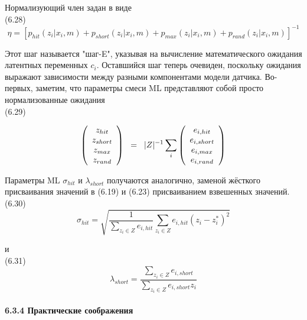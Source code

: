 \documentclass[10pt,a4paper]{article}
\begin{document}
Нормализующий член задан в виде\\

(6.28)
$$\eta=[p_{hit}(z_i|x_i,m)+p_{short}(z_i|x_i,m)
+p_{max}(z_i|x_i,m)+p_{rand}(z_i|x_i,m)]^{-1}$$

Этот шаг называется "шаг-E", указывая на вычисление математического ожидания латентных переменных $c_i$. Оставшийся шаг теперь очевиден, поскольку ожидания выражают зависимости между разными компонентами модели датчика. Во-первых, заметим, что параметры смеси ML представляют собой просто нормализованные ожидания\\

(6.29)
\begin{minipage}{0.3\textwidth}
	\begin{equation*}
	\left(\begin{array}{c}
	z_{hit}\\
	z_{short}\\
	z_{max}\\
	z_{rand}\\
	\end{array}\right)
	\hspace{2mm}
	=
	\hspace{2mm}
	|Z|^{-1}\sum_i
	\left(\begin{array}{c}
	e_{i,hit}\\
	e_{i,short}\\
	e_{i,max}\\
	e_{i,rand}\\
	\end{array}\right)
	\end{equation*}
\end{minipage}

Параметры ML $\sigma_{hit}$ и $\lambda_{short}$ получаются аналогично, заменой жёсткого присваивания значений в (6.19) и (6.23) присваиванием взвешенных значений.\\

(6.30)
$$\sigma_{hit}=\sqrt{\frac{1}{\sum_{z_i\in Z}e_{i,hit}}\sum_{z_i\in Z}e_{i,hit}(z_i-z_i^*)^2}$$

и\\

(6.31)
$$\lambda_{short}=\frac{\sum_{z_i\in Z}e_{i,short}}{\sum_{z_i\in Z}e_{i,short}z_i}$$\\

\textbf{6.3.4 Практические соображения}\\
\end{document}
